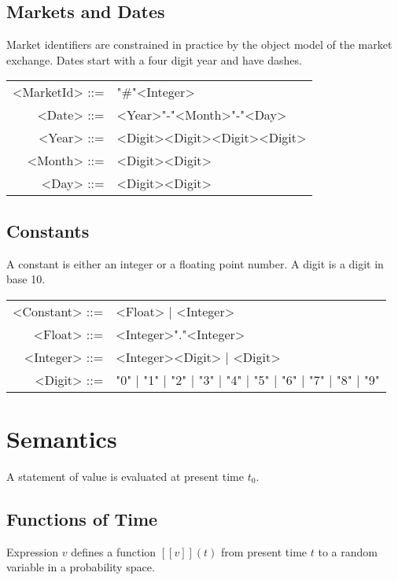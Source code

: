 \documentclass[a4paper,11pt]{article}
\newcommand{\sembrack}[1]{[\![#1]\!]}
\begin{document}
\subsection{Markets and Dates}

Market identifiers are constrained in practice by the object model of the market exchange. Dates start with a four digit year and have dashes.

\begin{tabular}{rl}
\\
<MarketId> ::= & "\#"<Integer> \\
<Date> ::= & <Year>"-"<Month>"-"<Day> \\
<Year> ::= & <Digit><Digit><Digit><Digit> \\
<Month> ::= & <Digit><Digit> \\
<Day> ::= & <Digit><Digit> \\
\end{tabular}

\subsection{Constants}

A constant is either an integer or a floating point number. A digit is a digit in base 10.

\begin{tabular}{rl}
\\
<Constant> ::= & <Float> | <Integer>\\
<Float> ::= & <Integer>"."<Integer> \\
<Integer> ::= & <Integer><Digit> | <Digit>\\
<Digit> ::= & "0" | "1" | "2" | "3" | "4" | "5" | "6" | "7" | "8" | "9" \\
\end{tabular}

\section{Semantics}

A statement of value is evaluated at present time $t_0$.

\subsection{Functions of Time}

Expression $v$ defines a function $\sembrack{v}(t)$ from present time $t$ to a random variable in a probability space.
\end{document}
